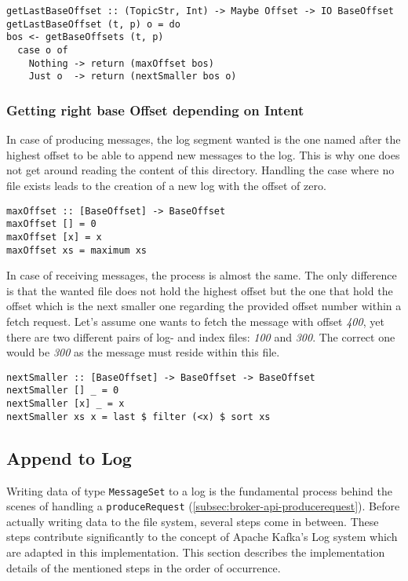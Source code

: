 \begin{lstlisting}[caption={Get highest base offset existing of given topic and partition}]
getLastBaseOffset :: (TopicStr, Int) -> Maybe Offset -> IO BaseOffset
getLastBaseOffset (t, p) o = do
bos <- getBaseOffsets (t, p)
  case o of
    Nothing -> return (maxOffset bos)
    Just o  -> return (nextSmaller bos o)
\end{lstlisting}

\subsubsection{Getting right base Offset depending on Intent}
In case of producing messages, the log segment wanted is the one named after the
highest offset to be able to append new messages to the log. This is why one
does not get around reading the content of this directory. Handling the case
where no file exists leads to the creation of a new log with the offset of zero.

\begin{lstlisting}[caption={Determining highest offset of given list}]
maxOffset :: [BaseOffset] -> BaseOffset
maxOffset [] = 0
maxOffset [x] = x
maxOffset xs = maximum xs
\end{lstlisting}

In case of receiving messages, the process is almost the same. The only
difference is that the wanted file does not hold the highest offset but the one
that hold the offset which is the next smaller one regarding the provided offset
number within a fetch request. Let's assume one wants to fetch the message with
offset \textit{400}, yet there are two different pairs of log- and index
files: \textit{100} and \textit{300}. The correct one would be \textit{300} as the
message must reside within this file.

\begin{lstlisting}[caption={Determining offset which is next smaller regarding given offset}]
nextSmaller :: [BaseOffset] -> BaseOffset -> BaseOffset
nextSmaller [] _ = 0
nextSmaller [x] _ = x
nextSmaller xs x = last $ filter (<x) $ sort xs
\end{lstlisting}

\subsection{Append to Log}
\label{subsec:broker-log-append}

Writing data of type \lstinline{MessageSet} to a log is the fundamental process behind the
scenes of handling a \lstinline{produceRequest}
(\ref{subsec:broker-api-producerequest}). Before actually writing data to the
file system, several steps come in between. These steps contribute significantly to the
concept of Apache Kafka's Log system which are adapted in this implementation.
This section describes the implementation details of the mentioned steps in the
order of occurrence.

